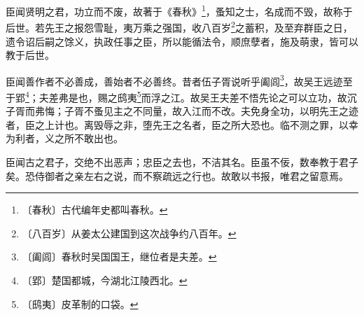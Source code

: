 \documentclass[12pt,UTF-8,openany]{ctexbook}
\begin{document}
\begin{normalsize}
    臣闻贤明之君，功立而不废，故著于《春秋》\footnote{〔春秋〕古代编年史都叫春秋。}，蚤知之士，名成而不毁，故称于后世。若先王之报怨雪耻，夷万乘之强国，收八百岁\footnote{〔八百岁〕从姜太公建国到这次战争约八百年。}之蓄积，及至弃群臣之日，遗令诏后嗣之馀义，执政任事之臣，所以能循法令，顺庶孽者，施及萌隶，皆可以教于后世。
    
    臣闻善作者不必善成，善始者不必善终。昔者伍子胥说听乎阖闾\footnote{〔阖闾〕春秋时吴国国王，继位者是夫差。}，故吴王远迹至于郢\footnote{〔郢〕楚国都城，今湖北江陵西北。}；夫差弗是也，赐之鸱夷\footnote{〔鸱夷〕皮革制的口袋。}而浮之江。故吴王夫差不悟先论之可以立功，故沉子胥而弗悔；子胥不蚤见主之不同量，故入江而不改。夫免身全功，以明先王之迹者，臣之上计也。离毁辱之非，堕先王之名者，臣之所大恐也。临不测之罪，以幸为利者，义之所不敢出也。
    
    臣闻古之君子，交绝不出恶声；忠臣之去也，不洁其名。臣虽不佞，数奉教于君子矣。恐侍御者之亲左右之说，而不察疏远之行也。故敢以书报，唯君之留意焉。
\end{normalsize}
\end{document}
